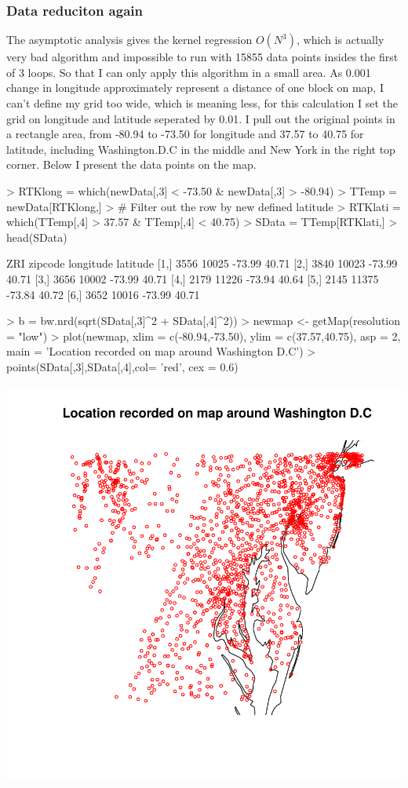 \documentclass[a4paper]{article}
\begin{document}
\subsubsection{Data reduciton again}
The asymptotic analysis gives the kernel regression $O(N^3)$, which is actually very bad algorithm and impossible to run with 15855 data points insides the first of 3 loops. So that I can only apply this algorithm in a small area.
As 0.001 change in longitude approximately represent a distance of one block on map, I can't define my grid too wide, which is meaning less, for this calculation I set the grid on longitude and latitude seperated by 0.01.
I pull out the original points in a rectangle area, from -80.94 to -73.50 for longitude and 37.57 to 40.75 for latitude, including Washington.D.C in the middle and New York in the right top corner. Below I present the data points on the map.
\begin{Schunk}
\begin{Sinput}
> RTKlong = which(newData[,3] < -73.50 & newData[,3] > -80.94)
> TTemp = newData[RTKlong,]
> # Filter out the row by new defined latitude
> RTKlati = which(TTemp[,4] > 37.57 & TTemp[,4] < 40.75)
> SData = TTemp[RTKlati,]
> head(SData)
\end{Sinput}
\begin{Soutput}
      ZRI zipcode longitude latitude
[1,] 3556   10025    -73.99    40.71
[2,] 3840   10023    -73.99    40.71
[3,] 3656   10002    -73.99    40.71
[4,] 2179   11226    -73.94    40.64
[5,] 2145   11375    -73.84    40.72
[6,] 3652   10016    -73.99    40.71
\end{Soutput}
\begin{Sinput}
> b = bw.nrd(sqrt(SData[,3]^2 + SData[,4]^2))
> newmap <- getMap(resolution = "low")
> plot(newmap, xlim = c(-80.94,-73.50), ylim = c(37.57,40.75), asp = 2, main = 'Location recorded on map around Washington D.C')
> points(SData[,3],SData[,4],col= 'red', cex = 0.6)
\end{Sinput}
\end{Schunk}
\includegraphics{project_tex-test6}
\end{document}

